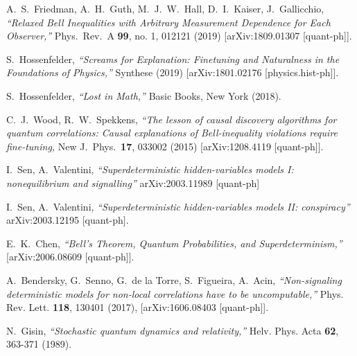 \documentclass[12pt]{article}
\begin{document}
\begin{thebibliography}{99}
{  %
  A.~S.~Friedman, A.~H.~Guth, M.~J.~W.~Hall, D.~I.~Kaiser, J.~Gallicchio,
  {\sl ``Relaxed Bell Inequalities with Arbitrary Measurement Dependence for Each Observer,''}
  Phys.\ Rev.\ A {\bf 99}, no. 1, 012121 (2019)
  [arXiv:1809.01307 [quant-ph]].

  S.~Hossenfelder,
  {\sl ``Screams for Explanation: Finetuning and Naturalness in the Foundations of Physics,''} Synthese (2019)
[arXiv:1801.02176 [physics.hist-ph]].

  S.~Hossenfelder,
  {\sl ``Lost in Math,''} Basic Books, New York (2018).

 


C.~J.~Wood, R.~W.~Spekkens, {\sl ``The lesson of causal discovery algorithms for quantum correlations: Causal explanations of Bell-inequality violations require fine-tuning,} New J.\ Phys.\ {\bf 17}, 033002 (2015) [arXiv:1208.4119 [quant-ph]].
 

 I.~Sen, A.~Valentini, {\sl ``Superdeterministic hidden-variables models I: nonequilibrium and signalling''} 	arXiv:2003.11989 [quant-ph]

 I.~Sen, A.~Valentini, {\sl ``Superdeterministic hidden-variables models II: conspiracy''} arXiv:2003.12195 [quant-ph].

E.~K.~Chen,
{\sl ``Bell's Theorem, Quantum Probabilities, and Superdeterminism,''}
[arXiv:2006.08609 [quant-ph]].
 
 
A.~Bendersky, G.~Senno, G.~de la Torre, S.~Figueira, A.~Acin, {\sl ``Non-signaling deterministic models for non-local correlations have to be uncomputable,''} Phys. Rev. Lett. {\bf 118}, 130401 (2017), [arXiv:1606.08403 [quant-ph]].

    
 

N.~Gisin,
{\sl ``Stochastic quantum dynamics and relativity,''}
Helv. Phys. Acta \textbf{62}, 363-371 (1989).

}
\end{thebibliography}
\end{document}
